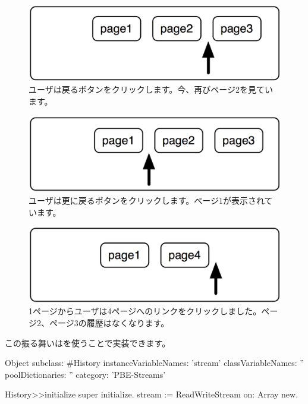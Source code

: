 \documentclass[a4paper,10pt,twoside]{book}
\begin{document}
\begin{figure}[!ht]
\centerline{\includegraphics[scale=0.5]{page2_Stef}}
\caption{ユーザは戻るボタンをクリックします。今、再びページ2を見ています。}
\vspace{.2in}
\end{figure}

\begin{figure}[!ht]
\centerline{\includegraphics[scale=0.5]{page1_Stef}}
\caption{ユーザは更に戻るボタンをクリックします。ページ1が表示されています。}
\vspace{.2in}
\end{figure}

\begin{figure}[!ht]
\centerline{\includegraphics[scale=0.5]{page4Stef}}
\caption{1ページからユーザは4ページへのリンクをクリックしました。ページ2、ページ3の履歴はなくなります。}
\vspace{.2in}
\end{figure}

この振る舞いはを使うことで実装できます。

\begin{code}{}
Object subclass: #History
  instanceVariableNames: 'stream'
  classVariableNames: ''
  poolDictionaries: ''
  category: 'PBE-Streams'

History>>initialize
    super initialize.
    stream := ReadWriteStream on: Array new.
\end{code}
\end{document}
